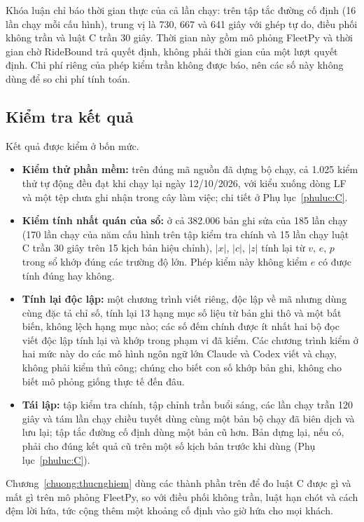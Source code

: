 Khóa luận chỉ báo thời gian thực của cả lần chạy: trên tập tắc đường cố định (16 lần chạy mỗi cấu hình), trung vị là
730, 667 và 641 giây với ghép tự do, điều phối không trần và luật C trần 30 giây. Thời gian này gồm mô phỏng FleetPy
và thời gian chờ RideBound trả quyết định, không phải thời gian của một lượt quyết định. Chi phí riêng của phép kiểm trần
không được báo, nên các số này không dùng để so chi phí tính toán.

\subsection{Kiểm tra kết quả}
\label{muc:kiemtra}

Kết quả được kiểm ở bốn mức.
\begin{itemize}[leftmargin=1.2cm,itemsep=2pt,topsep=3pt]
\item \textbf{Kiểm thử phần mềm:} trên đúng mã nguồn đã dựng bộ chạy, cả 1.025 kiểm thử tự động đều đạt khi chạy lại
ngày 12/10/2026, với kiểu xuống dòng LF và một tệp chưa ghi nhận trong cây làm việc; chi tiết ở Phụ lục~\ref{phuluc:C}.
\item \textbf{Kiểm tính nhất quán của sổ:} ở cả 382.006 bản ghi sửa của 185 lần chạy (170 lần chạy của năm cấu hình
trên tập kiểm tra chính và 15 lần chạy luật C trần 30 giây trên 15 kịch bản hiệu chỉnh), $|x|$, $|c|$, $|z|$ tính
lại từ $v$, $e$, $p$ trong sổ khớp đúng các trường độ lớn. Phép kiểm này không kiểm $e$ có được tính đúng hay không.
\item \textbf{Tính lại độc lập:} một chương trình viết riêng, độc lập về mã nhưng dùng cùng đặc tả chỉ số, tính lại
13 hạng mục số liệu từ bản ghi thô và một bất biến, không lệch hạng mục nào; các số đếm chính được ít nhất hai bộ đọc
viết độc lập tính lại và khớp trong phạm vi đã kiểm. Các chương trình kiểm ở hai mức này do các mô hình ngôn ngữ lớn
Claude và Codex viết và chạy, không phải kiểm thủ công; chúng cho biết con số khớp bản ghi, không cho biết mô phỏng
giống thực tế đến đâu.
\item \textbf{Tái lập:} tập kiểm tra chính, tập chỉnh trần buổi sáng, các lần chạy trần 120 giây và tám lần chạy chiều
tuyết dùng cùng một bản bộ chạy đã biên dịch và lưu lại; tập tắc đường cố định dùng một bản cũ hơn. Bản dựng lại, nếu có,
phải cho đúng kết quả cũ trên một số kịch bản trước khi dùng (Phụ lục~\ref{phuluc:C}).
\end{itemize}

Chương~\ref{chuong:thucnghiem} dùng các thành phần trên để đo luật C được gì và mất gì trên mô phỏng FleetPy, so
với điều phối không trần, luật hạn chót và cách đệm lời hứa, tức cộng thêm một khoảng cố định vào giờ hứa cho mọi
khách.
